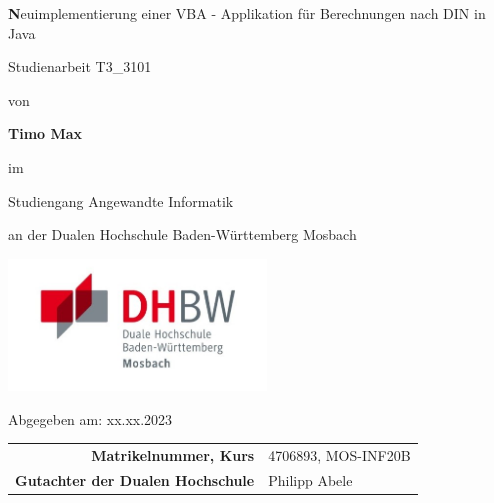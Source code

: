 
\def\title{Neuimplementierung einer VBA - Applikation für Berechnungen nach DIN in Java}
\def\abgabe{xx.xx.2023}

\begin{titlepage}
	
	
	
	\vspace{5pt}
	
	\begin{center}
		
		\Large \textbf\title
		
		\vspace{50pt}
		
		\large Studienarbeit T3\_3101
		
		von 
		
		\large \textbf{Timo Max} 
		
		\vspace{15pt}
		
		im
		
		\large Studiengang Angewandte Informatik
		
		an der Dualen Hochschule Baden-Württemberg Mosbach

        \vspace{10pt}

        \includegraphics[height=3.5cm]{images/dhbw-logo.jpg}
		
		\vspace{20pt}
		
		\large Abgegeben am: \abgabe
		
		\vspace{30pt}

		
		\begin{table}[h]
			\centering
			\begin{tabular}{r l}
				\large\textbf{Matrikelnummer, Kurs} & \large 4706893, MOS-INF20B \\
                \large\textbf{Gutachter der Dualen Hochschule} & \large Philipp Abele \\
			\end{tabular}
			
		\end{table}
		
	\end{center}
	
	
\end{titlepage}